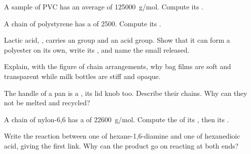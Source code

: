 \begin{exercise}[$\star\star$]\label{exo:g12:polymers:6}
A sample of PVC has an average  of \qty{125000}{g/mol}.
Compute its .
\end{exercise}

\begin{exercise}[$\star\star$]\label{exo:g12:polymers:7}
A chain of polystyrene has a  of 2500. Compute
its .
\end{exercise}

\begin{exercise}[$\star\star$]\label{exo:g12:polymers:8}
Lactic acid, , carries an  group and an acid
group. Show that it can form a polyester on its own, write its , and name the small  released.
\end{exercise}

\begin{exercise}[$\star\star$]\label{exo:g12:polymers:9}
Explain, with the figure of chain arrangements, why bag films are soft
and transparent while milk bottles are stiff and opaque.
\end{exercise}

\begin{exercise}[$\star\star$]\label{exo:g12:polymers:10}
The handle of a pan is a , its  lid knob too. Describe
their chains. Why can they not be melted and recycled?
\end{exercise}

\begin{exercise}[$\star\star$]\label{exo:g12:polymers:11}
A chain of nylon-6,6 has a  of \qty{22600}{g/mol}. Compute the
 of its  , then its .
\end{exercise}

\begin{exercise}[$\star\star\star$]\label{exo:g12:polymers:12}
Write the reaction between one  of hexane-1,6-diamine and one of
hexanedioic acid, giving the first  link. Why can the product go on
reacting at both ends?
\end{exercise}

